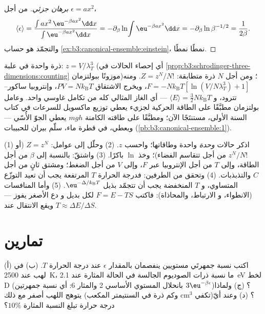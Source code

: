 \begin{proof}[برهان جزئي]
من أجل $\epsilon = ax^2$،
\[
\langle\epsilon\rangle
 = \frac{\int ax^2\,\eu^{-\beta ax^2}\dd x}
        {\int\eu^{-\beta ax^2}\dd x}
 = -\partial_\beta\ln\!\int\eu^{-\beta ax^2}\dd x
 = -\partial_\beta\ln\beta^{-1/2} = \frac{1}{2\beta} .
\] والتجمّد هو
حساب \cref{ex:b3:canonical-ensemble:einstein}، نمطًا
نمطًا.
\end{proof}

\begin{example}\label{ex:b3:canonical-ensemble:gas}
ذرة واحدة في علبة: $z = V/\lambda_T^3$ (أي إحصاء الحالات في
\cref{prop:b3:schrodinger-three-dimensions:counting} موزونًا
ببولتزمان)؛ ومن أجل $N$ ذرة متطابقة: $Z = z^N/N!$. ومنه $F =
-Nk_{\text{B}}T[\ln(V/N\lambda_T^3) + 1]$، ويخرج الاشتقاق
$PV = Nk_{\text{B}}T$، وإنتروبيا ساكور--تترود، و
$\langle E\rangle = \tfrac32 Nk_{\text{B}}T$ --- أي الغاز المثالي كله
من تكامل غاوسي واحد. وعامل بولتزمان مطبَّقًا على الطاقة
الحركية لجزيء يعطي توزيع ماكسويل للسرعات في
كتاب السنة الأولى، مستنتَجًا الآن؛ ومطبَّقًا على طاقته الكامنة
$mgh$ يعطي الجوّ الأُسّي --- ويعطي، في قطرة
ماء، سلّم بيران للحبيبات
(\cref{pb:b3:canonical-ensemble:1}).
\end{example}

\begin{method}\label{met:b3:canonical-ensemble:method}
(1) اذكر حالات \emph{وحدة} واحدة وطاقاتها؛ واحسب $z$.
(2) وحلّل إلى عوامل: $Z = z^N$ (أو $z^N/N!$ من أجل 
تتقاسم الفضاء)؛ وخذ $\ln$ باكرًا. (3) واشتقّ: بالنسبة إلى $\beta$ من أجل
الطاقة، وإلى $T$ من أجل الإنتروبيا عبر $F$، وإلى $V$ من أجل الضغط؛ ومشتق
ثانٍ من أجل $C$ والتذبذبات. (4) وتحقق من الطرفين: فدرجة الحرارة $T$ المرتفعة
يجب أن تعيد التوزّع المتساوي، و $T$ المنخفضة يجب أن تتجمّد بذيل
$\eu^{-\Delta/k_{\text{B}}T}$. (5) وأما المنافسات (الانطواء، و
الارتباط، والمحاذاة): فاكتب $F = E - TS$ لكل بديل و
دع الأصغر يفوز --- ويقع الانتقال عند $T \approx \Delta
E/\Delta S$.
\end{method}

\section{تمارين}

\begin{exercise}[$\star$]\label{exo:b3:canonical-ensemble:1}
(أ) اكتب نسبة جمهرتَي مستويين ينفصمان بالمقدار $\epsilon$ عند
درجة الحرارة $T$. (ب) في لهب عند \qty{2500}{K}، ما نسبة
ذرات الصوديوم الجالسة في الحالة المثارة عند \qty{2.1}{eV} لخط D
(بانحلال المستوي الأساسي 2 والمثار 6: أي نسبة جمهرتين
$3\eu^{-\beta\epsilon}$)؟
(ج) ولماذا يتوهج اللهب أصفر مع ذلك (وكم ذرة في
السنتيمتر المكعب cm$^3$ تكفي)؟ (د) وعند أيّ درجة حرارة تبلغ النسبة المثارة
$10\%$؟
\end{exercise}

